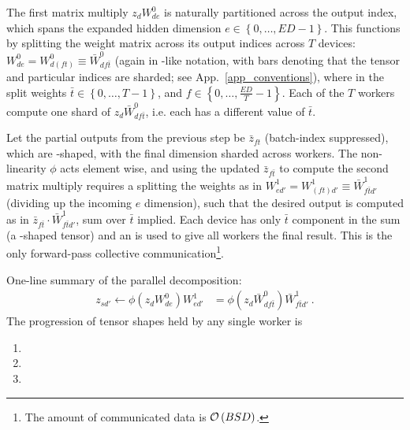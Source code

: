 The first matrix multiply $ z _{ d }W ^{ 0 } _{ d e } $ is naturally partitioned across the output
index, which spans the expanded hidden dimension $ e\in \left \{ 0, \ldots , ED-1 \right \} $. This
functions by splitting the weight matrix across its output indices across $ T $ devices:  $ W ^{ 0 }
_{ d e }= W ^{ 0 }_{ d (f t) } \equiv  \bar{W} ^{ 0 } _{ d f \bar{t} }$ (again in
-like notation, with bars denoting that the tensor and particular indices are
sharded; see App.~\ref{app_conventions}), where in the split weights $ \bar{t}\in \left \{ 0, \ldots
, T-1 \right \} $, and $ f \in \left \{ 0, \ldots , \frac{ ED }{ T } -1\right \} $. Each of the $ T
$ workers compute one shard of $ z _{ d }\bar{W} ^{ 0 }_{ df \bar{t} } $, i.e. each has a different
value of $ \bar{t} $.


Let the partial outputs from the previous step be $ \bar{z} _{ ft }  $ (batch-index suppressed),
which are -shaped, with the final dimension sharded across workers. The
non-linearity $ \phi $ acts element wise, and using the updated $ \bar{z} _{ f \bar{t} }   $ to
compute the second matrix multiply requires a splitting the weights as in $ W ^{ 1 } _{ e d' }= W ^{
1 }_{ (ft)d' } \equiv \bar{W} ^{ 1 } _{  f \bar{t} d'}$ (dividing up the incoming $ e $ dimension),
such that the desired output is computed as in $  \bar{z} _{ f \bar{t} }\cdot \bar{W} ^{ 1 }_{ f
\bar{t}d' }$, sum over $ \bar{t} $ implied. Each device has only $\bar{t} $ component in the sum (a
-shaped tensor) and an  is used to give all workers the
final result. This  is the only forward-pass collective
communication\footnote{The amount of communicated data is $ \mathcal{O} \left( BSD \right)$.}.

One-line summary of the parallel decomposition:
\begin{align}
 z _{ sd' } \leftarrow   \phi \left (z _{ d }W ^{ 0 }_{ de }\right )W ^{ 1 } _{ ed' } &=\phi \left (z _{ d }\bar{W} ^{ 0 }_{ df \bar{t} }\right )\bar{W} ^{ 1 } _{ f \bar{t}d' } \ .
\end{align}
The progression of tensor shapes held by any single worker is
\begin{enumerate}
    \item {}
    \item {}
    \item {}
\end{enumerate}

